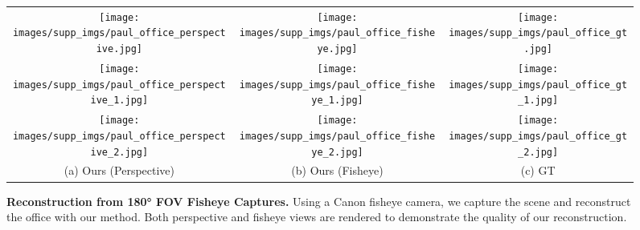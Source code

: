 {
\begin{figure*}[t]
    \centering
    \setlength{\tabcolsep}{1pt} %
    \begin{tabular}{ccc} %
        \texttt{[image: images/supp\_imgs/paul\_office\_perspective.jpg]} &
         \texttt{[image: images/supp\_imgs/paul\_office\_fisheye.jpg]} &
        \texttt{[image: images/supp\_imgs/paul\_office\_gt.jpg]} \\

        \texttt{[image: images/supp\_imgs/paul\_office\_perspective\_1.jpg]} &
         \texttt{[image: images/supp\_imgs/paul\_office\_fisheye\_1.jpg]} &
        \texttt{[image: images/supp\_imgs/paul\_office\_gt\_1.jpg]} \\

        \texttt{[image: images/supp\_imgs/paul\_office\_perspective\_2.jpg]} &
         \texttt{[image: images/supp\_imgs/paul\_office\_fisheye\_2.jpg]} &
        \texttt{[image: images/supp\_imgs/paul\_office\_gt\_2.jpg]}\\

        \multicolumn{1}{c}{(a) Ours (Perspective)} & \multicolumn{1}{c}{(b) Ours (Fisheye)} & \multicolumn{1}{c}{(c) GT}
    \end{tabular}

    \caption{\textbf{Reconstruction from 180\si{\degree} FOV Fisheye Captures.} Using a Canon fisheye camera, we capture the scene and reconstruct the office with our method. Both perspective and fisheye views are rendered to demonstrate the quality of our reconstruction.}


    \label{fig:supp_paul_office}

\end{figure*}
}